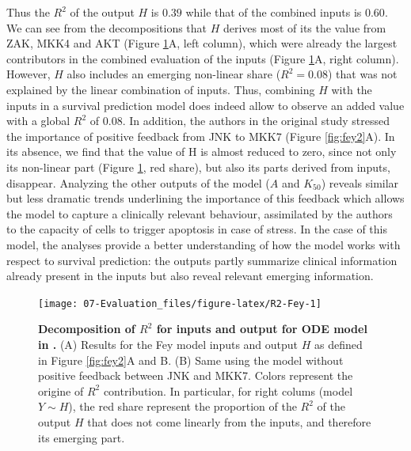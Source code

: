 \documentclass[a4paper,12pt,twoside,onecolumn,openright,final,oldfontcommands]{memoir}
\begin{document}
Thus the \(R^2\) of the output \(H\) is \(0.39\) while that of the
combined inputs is \(0.60\). We can see from the decompositions that
\(H\) derives most of its the value from ZAK, MKK4 and AKT (Figure
\ref{fig:R2-Fey}A, left column), which were already the largest
contributors in the combined evaluation of the inputs (Figure
\ref{fig:R2-Fey}A, right column). However, \(H\) also includes an
emerging non-linear share (\(R^2=0.08\)) that was not explained by the
linear combination of inputs. Thus, combining \(H\) with the inputs in a
survival prediction model does indeed allow to observe an added value
with a global \(R^2\) of \(0.08\). In addition, the authors in the
original study stressed the importance of positive feedback from JNK to
MKK7 (Figure \ref{fig:fey2}A). In its absence, we find that the value of
H is almost reduced to zero, since not only its non-linear part (Figure
\ref{fig:R2-Fey}, red share), but also its parts derived from inputs,
disappear. Analyzing the other outputs of the model (\(A\) and
\(K_{50}\)) reveals similar but less dramatic trends underlining the
importance of this feedback which allows the model to capture a
clinically relevant behaviour, assimilated by the authors to the
capacity of cells to trigger apoptosis in case of stress. In the case of
this model, the analyses provide a better understanding of how the model
works with respect to survival prediction: the outputs partly summarize
clinical information already present in the inputs but also reveal
relevant emerging information.

\begin{figure}

{\centering \texttt{[image: 07-Evaluation\_files/figure-latex/R2-Fey-1]} 

}

\caption[Decomposition of $R^2$ for inputs and output for ODE model in @fey2015signaling]{\textbf{Decomposition of \(R^2\) for inputs and
output for ODE model in \citet{fey2015signaling}.} (A) Results for the
Fey model inputs and output \(H\) as defined in Figure \ref{fig:fey2}A
and B. (B) Same using the model without positive feedback between JNK
and MKK7. Colors represent the origine of \(R^2\) contribution. In
particular, for right colums (model\(Y\sim H\)), the red share represent
the proportion of the \(R^2\) of the output \(H\) that does not come
linearly from the inputs, and therefore its emerging part.}\label{fig:R2-Fey}
\end{figure}
\end{document}
